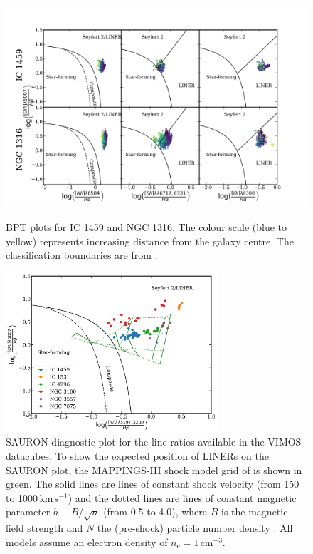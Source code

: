 		\begin{figure}
			\centering
			\includegraphics[width=.9\textwidth]{chapter5/BPT.png}
			\caption[BPT plots]{BPT plots for IC 1459 and NGC 1316. The colour scale (blue to yellow) represents increasing distance from the galaxy centre. The classification boundaries are from \citet{Kewley2006}.\label{fig:BPT}}

			\includegraphics[width=0.7\textwidth]{chapter5/SAURON.png}
			\caption[An alternative diagnostic plot]{SAURON diagnostic plot for the line ratios available in the VIMOS datacubes. To show the expected position of LINERs on the SAURON plot, the MAPPINGS-III shock model grid of \citet{Allen2008} is shown in green. The solid lines are lines of constant shock velocity (from 150 to 1000\,$\mathrm{km\,s^{-1}}$) and the dotted lines are lines of constant magnetic parameter $b \equiv B/\sqrt{n}$ (from 0.5 to 4.0), where $B$ is the magnetic field strength and $N$ the (pre-shock) particle number density \citep{Dopita1996}. All models assume an electron density of $n_\mathrm{e} = 1\,\mathrm{cm^{-3}}$.\label{fig:SAURON}}
		\end{figure}
		\restoregeometry

